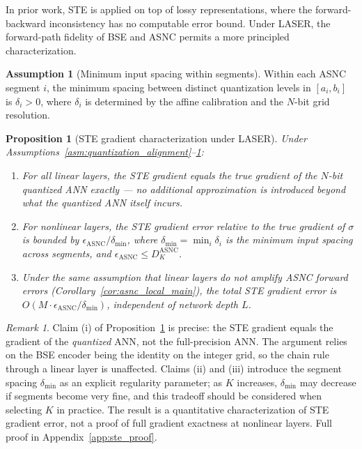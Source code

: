 \documentclass{article}
\theoremstyle{plain}
\newtheorem{proposition}[theorem]{Proposition}
\theoremstyle{definition}
\newtheorem{assumption}[theorem]{Assumption}
\theoremstyle{remark}
\newtheorem{remark}[theorem]{Remark}
\begin{document}
In prior work, STE is applied on top of lossy representations, where the
forward-backward inconsistency has no computable error bound. Under LASER, the
forward-path fidelity of BSE and ASNC permits a more principled characterization.

\begin{assumption}[Minimum input spacing within segments]
\label{asm:input_spacing}
Within each ASNC segment $i$, the minimum spacing between distinct quantization
levels in $[a_i, b_i]$ is $\delta_i > 0$, where $\delta_i$ is determined by the
affine calibration and the $N$-bit grid resolution.
\end{assumption}

\begin{proposition}[STE gradient characterization under LASER]
\label{prop:ste_main}
Under Assumptions~\ref{asm:quantization_alignment}--\ref{asm:input_spacing}:
\begin{enumerate}
  \item For all linear layers, the STE gradient equals the true gradient of the
        \emph{$N$-bit quantized ANN} exactly — no additional approximation
        is introduced beyond what the quantized ANN itself incurs.
  \item For nonlinear layers, the STE gradient error relative to the true gradient
        of $\sigma$ is bounded by $\epsilon_{\mathrm{ASNC}} / \delta_{\min}$,
        where $\delta_{\min} = \min_i \delta_i$ is the minimum input spacing
        across segments, and $\epsilon_{\mathrm{ASNC}} \le D_K^{\mathrm{ASNC}}$.
  \item Under the same assumption that linear layers do not amplify ASNC forward errors
        (Corollary~\ref{cor:asnc_local_main}), the total STE gradient error is
        $O(M \cdot \epsilon_{\mathrm{ASNC}} / \delta_{\min})$, independent of
        network depth $L$.
\end{enumerate}
\end{proposition}

\begin{remark}
Claim (i) of Proposition~\ref{prop:ste_main} is precise: the STE gradient equals the
gradient of the \emph{quantized} ANN, not the full-precision ANN. The argument relies
on the BSE encoder being the identity on the integer grid, so the chain rule through a
linear layer is unaffected. Claims (ii) and (iii) introduce the segment spacing
$\delta_{\min}$ as an explicit regularity parameter; as $K$ increases, $\delta_{\min}$
may decrease if segments become very fine, and this tradeoff should be considered when
selecting $K$ in practice. The result is a quantitative characterization of STE
gradient error, not a proof of full gradient exactness at nonlinear layers.
Full proof in Appendix~\ref{app:ste_proof}.
\end{remark}
\end{document}
